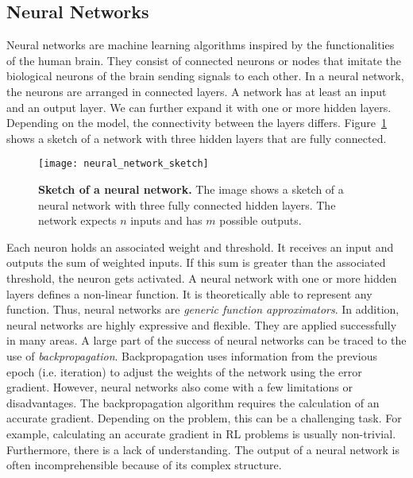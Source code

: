 \subsection{Neural Networks}
Neural networks are machine learning algorithms inspired by the functionalities of the human brain. They consist of connected neurons or nodes that imitate the biological neurons of the brain sending signals to each other. In a neural network, the neurons are arranged in connected layers. A network has at least an input and an output layer. We can further expand it with one or more hidden layers. Depending on the model, the connectivity between the layers differs. Figure~\ref{fig:neural_network_sketch} shows a sketch of a network with three hidden layers that are fully connected.
\begin{figure}[ht]
\centering
\texttt{[image: neural\_network\_sketch]}
\caption[Sketch of a Neural Network]{
  \textbf{Sketch of a neural network.}
  The image shows a sketch of a neural network with three fully connected hidden layers. The network expects $n$ inputs and has $m$ possible outputs.
}
\label{fig:neural_network_sketch}
\end{figure}
Each neuron holds an associated weight and threshold. It receives an input and outputs the sum of weighted inputs. If this sum is greater than the associated threshold, the neuron gets activated. A neural network with one or more hidden layers defines a non-linear function. It is theoretically able to represent any function. Thus, neural networks are \textit{generic function approximators}. In addition, neural networks are highly expressive and flexible. They are applied successfully in many areas. A large part of the success of neural networks can be traced to the use of \textit{backpropagation}. Backpropagation uses information from the previous epoch (i.e. iteration) to adjust the weights of the network using the error gradient. However, neural networks also come with a few limitations or disadvantages. The backpropagation algorithm requires the calculation of an accurate gradient. Depending on the problem, this can be a challenging task. For example, calculating an accurate gradient in RL problems is usually non-trivial. Furthermore, there is a lack of understanding. The output of a neural network is often incomprehensible because of its complex structure.





